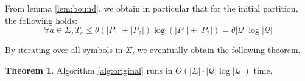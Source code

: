 \documentclass[12pt, a4 paper]{article}
\theoremstyle{definition}
\newtheorem{theorem}{Theorem}
\begin{document}
From lemma \ref{lem:bound}, we obtain in particular that for the initial partition, the following holds:
$$\forall a \in \Sigma, T_a \leq \theta(|P_1| + |P_2|)\log(|P_1| + |P_2|) = \theta|\mathcal{Q}| \log |\mathcal{Q}|$$

By iterating over all symbols in $\Sigma$, we eventually obtain the following theorem.

\begin{theorem}
    \label{thm:complexity}
    Algorithm \ref{alg:original} runs in $O\left(|\Sigma|\cdot|\mathcal{Q}| \log |\mathcal{Q}|\right)$ time.
\end{theorem}


% 

\pagebreak


\end{document}
